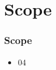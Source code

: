 \section{Scope}

\begin{frame}%
\frametitle{Scope}

\begin{itemize}
  \item 04
\end{itemize}

\end{frame}